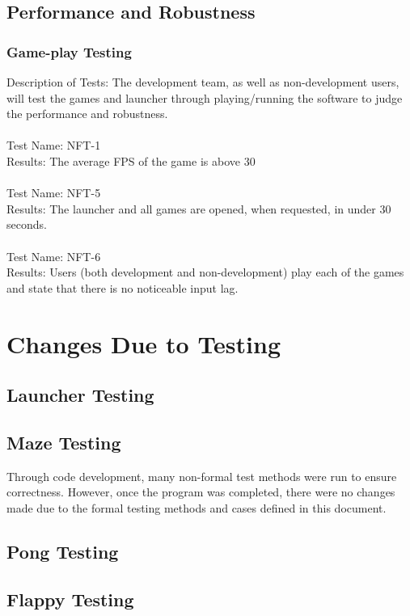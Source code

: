 \documentclass[12pt, titlepage]{article}
\begin{document}
	\subsection{Performance and Robustness}
	
	\subsubsection{Game-play Testing}
	Description of Tests: The development team, as well as non-development users, will test the games and launcher through playing/running the software to judge the performance and robustness.\\ \\
	Test Name: NFT-1\\
	Results: The average FPS of the game is above 30\\ \\ 
	Test Name: NFT-5\\ 
	Results: The launcher and all games are opened, when requested, in under 30 seconds.\\ \\
	Test Name: NFT-6\\
	Results: Users (both development and non-development) play each of the games and state that there is no noticeable input lag.

\section{Changes Due to Testing}

	\subsection{Launcher Testing}

	\subsection{Maze Testing}
	Through code development, many non-formal test methods were run to ensure correctness. However, once the program was completed, there were no changes made due to the formal testing methods and cases defined in this document.
	
	\subsection{Pong Testing}
	
	\subsection{Flappy Testing}
\end{document}
